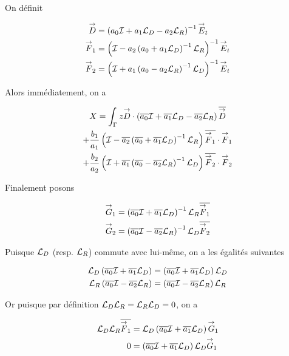   On définit

  \newcommand{\vD}{\vect{D}}
  \newcommand{\vF}{\vect{F}}

  \begin{align}
    \vD & = \left(a_0 \oI + a_1 \LD - a_2\LR \right)^{-1} \vE_t
    \\
    \vF_1 & = \left(\oI - a_2 \left( a_0 + a_1\LD\right)^{-1}\LR\right)^{-1} \vE_t
    \\
    \vF_2 & = \left(\oI + a_1 \left( a_0 - a_2\LR\right)^{-1}\LD\right)^{-1} \vE_t
  \end{align}

  Alors immédiatement, on a 

  \begin{multline}
    X = \int_\Gamma z \vD \cdot \left(\conj{a_0} \oI + \conj{a_1} \LD - \conj{a_2}\LR\right)\conj{\vD}
    \\
    + \frac{b_1}{a_1} \left(\oI - \conj{a_2} \left( \conj{a_0} + \conj{a_1}\LD\right)^{-1}\LR\right)\conj{\vF_1}\cdot\vF_1
    \\
    + \frac{b_2}{a_2} \left(\oI + \conj{a_1} \left( \conj{a_0} - \conj{a_2}\LR\right)^{-1}\LD\right)\conj{\vF_2}\cdot\vF_2
  \end{multline}

  Finalement posons

  \newcommand{\vG}{\vect{G}}

  \begin{align}
    \vG_1 & = \left(\conj{a_0} \oI + \conj{a_1} \LD \right)^{-1}\LR \conj{\vF_1}
    \\
    \vG_2 & = \left(\conj{a_0} \oI - \conj{a_2} \LR \right)^{-1}\LD \conj{\vF_2}
  \end{align}

  Puisque \({\mathcal{L}_D}\) (resp. \({\mathcal{L}_R}\)) commute avec lui-même, on a les égalités suivantes

  \begin{align}
    {\mathcal{L}_D}\left({\overline{a_0}} {\mathcal{I}} + {\overline{a_1}} {\mathcal{L}_D} \right)&=\left({\overline{a_0}} {\mathcal{I}} + {\overline{a_1}} {\mathcal{L}_D} \right){\mathcal{L}_D}
    \\
    {\mathcal{L}_R}\left({\overline{a_0}} {\mathcal{I}} - {\overline{a_2}} {\mathcal{L}_R} \right)&=\left({\overline{a_0}} {\mathcal{I}} - {\overline{a_2}} {\mathcal{L}_R} \right){\mathcal{L}_R}
  \end{align}

  Or puisque par définition \({\mathcal{L}_D}{\mathcal{L}_R}={\mathcal{L}_R}{\mathcal{L}_D}=0\), on a

  \begin{align}
    \LD\LR\conj{\vF_1} &= \LD\left(\conj{a_0} \oI + \conj{a_1} \LD \right)\vG_1
    \\
    0 & =\left(\conj{a_0} \oI + \conj{a_1} \LD \right)\LD\vG_1
  \end{align}

